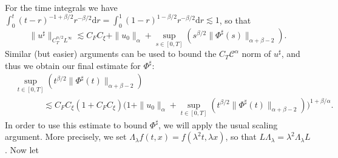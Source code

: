 \documentclass[a4paper,11pt]{article}
\newcommand{\mathd}{\mathrm{d}}
\theoremstyle{remark}
\newcommand{\CC}{\ensuremath{\mathscr{C}}}
\begin{document}
For the time integrals we have
$\int_{0}^{t} ( t-r )^{-1+ \beta /2} r^{-\beta /2} \mathd r = \int_{0}^{1} ( 1-r )^{1- \beta /2} r^{-\beta /2} \mathd r \lesssim 1$,
so that
\[
   \|u^\sharp\|_{C^{\alpha/2}_TL^\infty} \lesssim C_F C_\xi + \|u_0\|_\alpha + \sup_{s \in [ 0,T]} ( s^{\beta /2} \| \Phi^{\sharp} ( s ) \|_{\alpha + \beta -2} ).
\]
Similar (but easier) arguments can be used to bound the $C_T\CC^\alpha$ norm of $u^\sharp$, and thus we obtain our final estimate for $\Phi^\sharp$:
\begin{align}\label{eq:pam phi sharp final estimate} \nonumber
    &\sup_{t \in [ 0,T]} (t^{\beta /2} \| \Phi^{\sharp} ( t ) \|_{\alpha+\beta -2}) \\
    &\hspace{40pt} \lesssim C_F C_\xi (1+C_FC_\xi) \Big( 1 + \|u_0\|_\alpha + \sup_{t \in [ 0,T ]} (t^{\beta /2} \| \Phi^{\sharp} ( t ) \|_{\alpha + \beta - 2}) \Big)^{1+\beta/\alpha}.
\end{align}
%
%
%
In order to use this estimate to bound $\Phi^{\sharp}$, we will apply the
usual scaling argument. More
precisely, we set $\Lambda_{\lambda} f ( t,x ) = f ( \lambda^{2} t, \lambda x)$, so that $L  \Lambda_{\lambda} = \lambda^{2} \Lambda_{\lambda} L$. Now let
\end{document}

